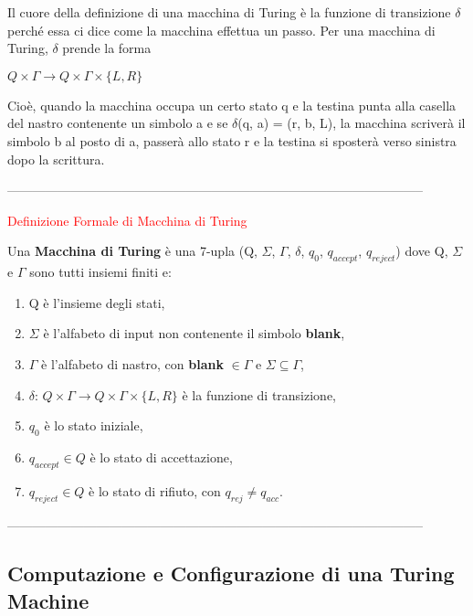 \documentclass{article}
\begin{document}
Il cuore della definizione di una macchina di Turing è la funzione di
transizione $\delta$ perché essa ci dice come la macchina effettua un passo. Per
una macchina di Turing, $\delta$ prende la forma

\begin{center}
    $Q \times \Gamma \rightarrow Q \times \Gamma \times \{L,R\}$
\end{center}

Cioè, quando la macchina occupa un certo stato q e la testina punta alla casella
del nastro contenente un simbolo a e se $\delta$(q, a) = (r, b, L), la macchina
scriverà il simbolo b al posto di a, passerà allo stato r e la testina si
sposterà verso sinistra dopo la scrittura.

--------------------------------------------------------------------------------------------------

\begin{center}
   \textcolor{red}{Definizione Formale di Macchina di Turing} 
\end{center}

Una \textbf{Macchina di Turing} è una 7-upla (Q, $\Sigma$, $\Gamma$, $\delta$,
$q_0$, $q_{accept}$, $q_{reject}$) dove Q, $\Sigma$ e $\Gamma$ sono tutti
insiemi finiti e:

\begin{enumerate}
    \item Q è l'insieme degli stati,
    \item $\Sigma$ è l'alfabeto di input non contenente il simbolo
    \textbf{blank},
    \item $\Gamma$ è l'alfabeto di nastro, con \textbf{blank} $\in \Gamma$ e
    $\Sigma \subseteq \Gamma$,
    \item $\delta$: $Q \times \Gamma \rightarrow Q \times \Gamma \times \{L,R\}$
    è la funzione di transizione,
    \item $q_0$ è lo stato iniziale,
    \item $q_{accept} \in Q$ è lo stato di accettazione,
    \item $q_{reject} \in Q$ è lo stato di rifiuto, con $q_{rej} \neq q_{acc}$.
\end{enumerate}

--------------------------------------------------------------------------------------------------

\subsection{Computazione e Configurazione di una Turing Machine}
\end{document}
